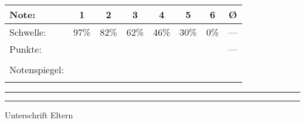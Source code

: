 {\begin{minipage}{0.45\textwidth}
	\renewcommand{\arraystretch}{1}
	{
		\begin{center}
		\begin{tabular}{|l||c|c|c|c|c|c||c|}
			\hline
			Note: & 1&2&3&4&5&6&\O\\\hline
			Schwelle:& 97\% & 82\% & 62\% & 46\% & 30\% & 0\%&---  \\\hline
			Punkte:& \fpeval{round(2*0.97*\value{gesamt})/2} & \fpeval{round(2*0.82*\value{gesamt})/2} & \fpeval{round(2*0.62*\value{gesamt})/2} & \fpeval{round(2*0.46*\value{gesamt})/2} & \fpeval{round(2*0.3*\value{gesamt})/2} & \fpeval{round(2*0.0*\value{gesamt})/2}&--- \\\hline
			& & & & & &  &\\
			Notenspiegel: & & & & & && \\ 
			& & & & & & &\\\hline
		\end{tabular}
	\end{center}
	}
\end{minipage}
\hspace{0.1\textwidth}
\begin{minipage}{0.4\textwidth}
	\vspace{1.5cm}
	\raggedleft\rule[0ex]{6cm}{1pt}
	
	\vspace{1cm}
	\raggedleft \rule[0ex]{4cm}{1pt}
	
	Unterschrift Eltern
	\vspace{1cm}
\end{minipage}
}

